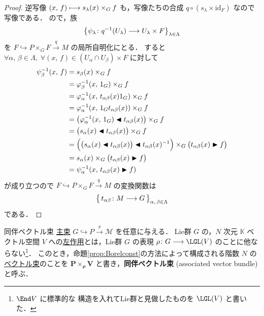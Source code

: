 \documentclass[TQFT_main]{subfiles}
\begin{document}
\begin{proof}
{        逆写像 $(x,\, f) \longmapsto s_\lambda(x) \times_G f$ も，\cinfty 写像たちの合成 $q \circ (s_\lambda \times \mathrm{id}_F)$ なので \cinfty 写像である．
    }
    ので，族 
    \begin{align}
        \bigl\{ \psi_\lambda \colon q^{-1}(U_\lambda) \longrightarrow U_\lambda \times F \bigr\}_{\lambda \in \Lambda}
    \end{align}
    を $F \hookrightarrow P \times_G F \xrightarrow{q} M$ の局所自明化にとる．
    すると $\forall \alpha,\, \beta \in \Lambda,\; \forall (x,\, f) \in (U_\alpha \cap U_\beta) \times F$ に対して
    \begin{align}
        \psi_\beta^{-1} (x,\, f) &= s_\beta(x) \times_G f \\
        &= \varphi_\beta^{-1}(x,\, 1_G) \times_G f \\
        &= \varphi_\alpha^{-1}(x,\, t_{\alpha\beta}(x)1_G) \times_G f \\
        &= \varphi_\alpha^{-1}(x,\, 1_G t_{\alpha\beta}(x)) \times_G f \\
        &= \bigl(\varphi_\alpha^{-1}(x,\, 1_G) \blacktriangleleft t_{\alpha\beta}(x)\bigr) \times_G f \\
        &= \bigl(s_\alpha (x) \blacktriangleleft t_{\alpha\beta}(x)\bigr) \times_G f \\
        &= \Bigl( \bigl(s_\alpha (x) \blacktriangleleft t_{\alpha\beta}(x)\bigr) \blacktriangleleft t_{\alpha\beta}(x)^{-1} \Bigr) \times_G \bigl(t_{\alpha\beta}(x) \blacktriangleright f\bigr) \\
        &= s_\alpha (x) \times_G \bigl( t_{\alpha\beta}(x) \blacktriangleright f \bigr) \\
        &= \psi_\alpha^{-1} (x,\, t_{\alpha\beta}(x) \blacktriangleright f)
    \end{align}
    が成り立つので $F \hookrightarrow P \times_G F \xrightarrow{q} M$ の変換関数は
    \begin{align}
        \bigl\{\, t_{\alpha\beta} \colon M \longrightarrow G  \,\bigr\}_{\alpha,\, \beta \in \Lambda}
    \end{align}
    である．
\end{proof}

\begin{myexample}[label=def:associated-vect]{同伴ベクトル束}
    \hyperref[def.fiber-1]{主束} $G \hookrightarrow P \xrightarrow{\pi} \mathcal{M}$ を任意に与える．
    Lie群 $G$ の，$N$ 次元 $\mathbb{K}$ ベクトル空間 $V$ への\hyperref[def:Lie-action]{左作用}とは，Lie群 $G$ の表現 $\rho \colon G \lto \LGL (V)$ のことに他ならない\footnote{$\End V$ に標準的な \cinfty 構造を入れてLie群と見做したものを $\LGL (V)$ と書いた．}．
    このとき，命題\ref{prop:Borelconst}の方法によって構成される階数 $N$ の\hyperref[def:vect]{ベクトル束}のことを $\bm{P \times_\rho V}$ と書き，\textbf{同伴ベクトル束} (associated vector bundle) と呼ぶ．
\end{myexample}
\end{document}
